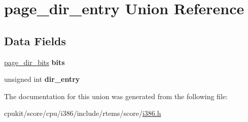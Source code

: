\hypertarget{unionpage__dir__entry}{}\section{page\+\_\+dir\+\_\+entry Union Reference}
\label{unionpage__dir__entry}
\subsection*{Data Fields}
\begin{DoxyCompactItemize}
\item 
\mbox{\label{unionpage__dir__entry_a7bec986b15367b870f8486bdd89084f9}} 
\mbox{\hyperlink{structpage__dir__bits}{page\+\_\+dir\+\_\+bits}} {\bfseries bits}
\item 
\mbox{\label{unionpage__dir__entry_a6bac20752810db1c3f372faccb150186}} 
unsigned int {\bfseries dir\+\_\+entry}
\end{DoxyCompactItemize}


The documentation for this union was generated from the following file\+:\begin{DoxyCompactItemize}
\item 
cpukit/score/cpu/i386/include/rtems/score/\mbox{\hyperlink{i386_8h}{i386.\+h}}\end{DoxyCompactItemize}
